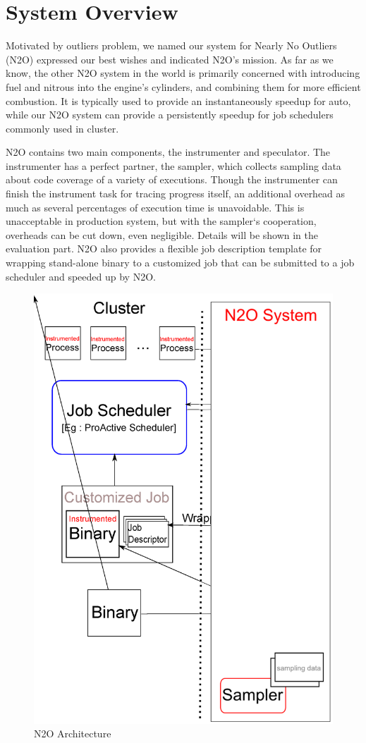 \section{System Overview}

Motivated by outliers problem, we named our system for Nearly No Outliers (N2O) expressed our best wishes and indicated N2O’s mission. As far as we know, the other N2O system in the world is primarily concerned with introducing fuel and nitrous into the engine's cylinders, and combining them for more efficient combustion. It is typically used to provide an instantaneously speedup for auto, while our N2O system can provide a persistently speedup for job schedulers commonly used in cluster.

N2O contains two main components, the instrumenter and speculator. The instrumenter has a perfect partner, the sampler, which collects sampling data about code coverage of a variety of executions. Though the instrumenter can finish the instrument task for tracing progress itself, an additional overhead as much as several percentages of execution time is unavoidable. This is unacceptable in production system, but with the sampler‘s cooperation, overheads can be cut down, even negligible. Details will be shown in the evaluation part. N2O also provides a flexible job description template for wrapping stand-alone binary to a customized job that can be submitted to a job scheduler and speeded up by N2O.

\begin{figure}
\centering
\includegraphics[width=0.9\columnwidth]{figures/N2O_arch.eps}
\caption{N2O Architecture}
\label{figure:n2oarch}
\end{figure}

